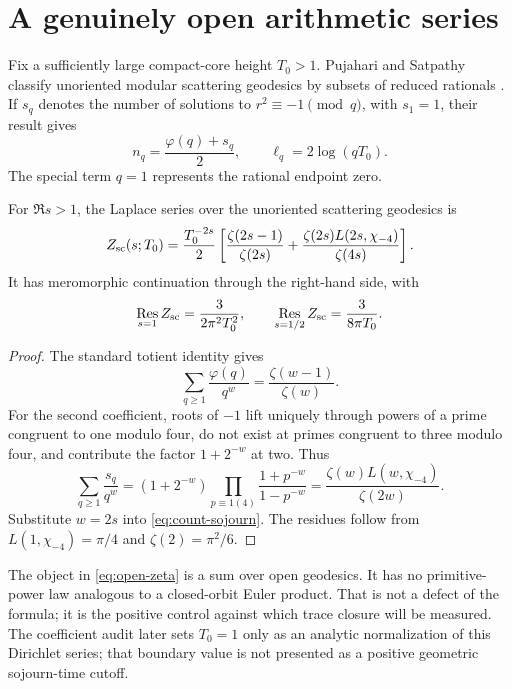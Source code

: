 \section{A genuinely open arithmetic series}

Fix a sufficiently large compact-core height \(T_0>1\).  Pujahari and Satpathy classify
unoriented modular scattering geodesics by subsets of reduced rationals
\cite{PujahariSatpathy2025}.  If \(s_q\) denotes the number of solutions to
\(r^2\equiv-1\pmod q\), with \(s_1=1\), their result gives
\begin{equation}
n_q=\frac{\varphi(q)+s_q}{2},\qquad
\ell_q=2\log(qT_0).
\label{eq:count-sojourn}
\end{equation}
The special term \(q=1\) represents the rational endpoint zero.

\begin{proposition}
For \(\Re s>1\), the Laplace series over the unoriented scattering geodesics
is
\begin{equation}
Z_{\rm sc}(s;T_0)
=\frac{T_0^{-2s}}2\left[
\frac{\zeta(2s-1)}{\zeta(2s)}+
\frac{\zeta(2s)L(2s,\chi_{-4})}{\zeta(4s)}
\right].
\label{eq:open-zeta}
\end{equation}
It has meromorphic continuation through the right-hand side, with
\begin{equation}
\operatorname*{Res}_{s=1}Z_{\rm sc}=\frac{3}{2\pi^2T_0^2},\qquad
\operatorname*{Res}_{s=1/2}Z_{\rm sc}=\frac{3}{8\pi T_0}.
\label{eq:open-residues}
\end{equation}
\end{proposition}

\begin{proof}
The standard totient identity gives
\[
\sum_{q\ge1}\frac{\varphi(q)}{q^w}
=\frac{\zeta(w-1)}{\zeta(w)}.
\]
For the second coefficient, roots of \(-1\) lift uniquely through powers of a
prime congruent to one modulo four, do not exist at primes congruent to three
modulo four, and contribute the factor \(1+2^{-w}\) at two.  Thus
\[
\sum_{q\ge1}\frac{s_q}{q^w}
=(1+2^{-w})\prod_{p\equiv1(4)}
\frac{1+p^{-w}}{1-p^{-w}}
=\frac{\zeta(w)L(w,\chi_{-4})}{\zeta(2w)}.
\]
Substitute \(w=2s\) into \cref{eq:count-sojourn}.  The residues follow from
\(L(1,\chi_{-4})=\pi/4\) and \(\zeta(2)=\pi^2/6\).
\end{proof}

The object in \cref{eq:open-zeta} is a sum over open geodesics.  It has no
primitive-power law analogous to a closed-orbit Euler product.  That is not a
defect of the formula; it is the positive control against which trace closure
will be measured.  The coefficient audit later sets \(T_0=1\) only as an
analytic normalization of this Dirichlet series; that boundary value is not
presented as a positive geometric sojourn-time cutoff.

